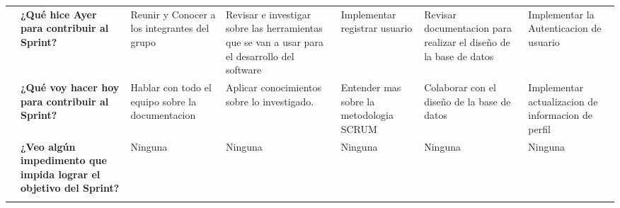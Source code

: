 \begin{longtable}{|c|P{2.5cm}|P{2cm}|P{2.5cm}|P{2.2cm}|P{2.2cm}|P{2cm}|}
    & \textbf {¿Qué hice Ayer para contribuir al Sprint?} 
    & Reunir y Conocer a los integrantes del grupo 
    & Revisar e investigar sobre las herramientas que se van a usar para el desarrollo del software 
    & Implementar registrar usuario
    & Revisar documentacion para realizar el diseño de la base de datos
    & Implementar la Autenticacion de usuario \\ 
    & \textbf {¿Qué voy hacer hoy para contribuir al Sprint?} 
    & Hablar con todo el equipo sobre la documentacion
    & Aplicar conocimientos sobre lo investigado.
    & Entender mas sobre la metodologia SCRUM
    & Colaborar con el diseño de la base de datos 
    & Implementar actualizacion  de informacion de perfil\\ 
    & \textbf {¿Veo algún impedimento que impida lograr el objetivo del Sprint?} 
    & Ninguna
    & Ninguna
    & Ninguna
    & Ninguna 
    & Ninguna\\    
    
    

    \\
    \hline

\end{longtable}

